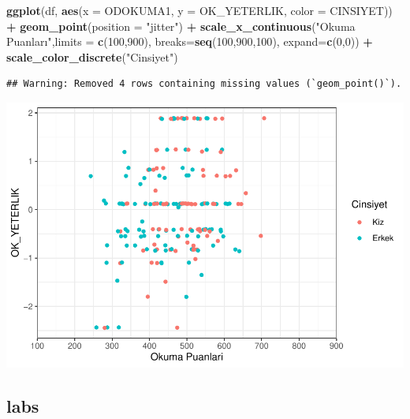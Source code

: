 \documentclass[
  oneside]{book}
\newenvironment{Shaded}{\begin{snugshade}}{\end{snugshade}}
\newcommand{\AttributeTok}[1]{\textcolor[rgb]{0.13,0.29,0.53}{#1}}
\newcommand{\DecValTok}[1]{\textcolor[rgb]{0.00,0.00,0.81}{#1}}
\newcommand{\FunctionTok}[1]{\textcolor[rgb]{0.13,0.29,0.53}{\textbf{#1}}}
\newcommand{\NormalTok}[1]{#1}
\newcommand{\SpecialCharTok}[1]{\textcolor[rgb]{0.81,0.36,0.00}{\textbf{#1}}}
\newcommand{\StringTok}[1]{\textcolor[rgb]{0.31,0.60,0.02}{#1}}
\begin{document}
\begin{Shaded}
\begin{Highlighting}[]
\FunctionTok{ggplot}\NormalTok{(df, }\FunctionTok{aes}\NormalTok{(}\AttributeTok{x =}\NormalTok{ ODOKUMA1,}
\AttributeTok{y =}\NormalTok{ OK\_YETERLIK,}
\AttributeTok{color =}\NormalTok{ CINSIYET)) }\SpecialCharTok{+}
\FunctionTok{geom\_point}\NormalTok{(}\AttributeTok{position =} \StringTok{"jitter"}\NormalTok{) }\SpecialCharTok{+}
\FunctionTok{scale\_x\_continuous}\NormalTok{(}\StringTok{"Okuma Puanları"}\NormalTok{,}\AttributeTok{limits =} \FunctionTok{c}\NormalTok{(}\DecValTok{100}\NormalTok{,}\DecValTok{900}\NormalTok{),}
                   \AttributeTok{breaks=}\FunctionTok{seq}\NormalTok{(}\DecValTok{100}\NormalTok{,}\DecValTok{900}\NormalTok{,}\DecValTok{100}\NormalTok{),}
                   \AttributeTok{expand=}\FunctionTok{c}\NormalTok{(}\DecValTok{0}\NormalTok{,}\DecValTok{0}\NormalTok{)) }\SpecialCharTok{+}
\FunctionTok{scale\_color\_discrete}\NormalTok{(}\StringTok{"Cinsiyet"}\NormalTok{)}
\end{Highlighting}
\end{Shaded}

\begin{verbatim}
## Warning: Removed 4 rows containing missing values (`geom_point()`).
\end{verbatim}

\begin{center}\includegraphics[width=1\linewidth]{15-betimleyici-istatistik_files/figure-latex/unnamed-chunk-54-1} \end{center}

\hypertarget{labs}{%
\subsection{labs}\label{labs}}
\end{document}

